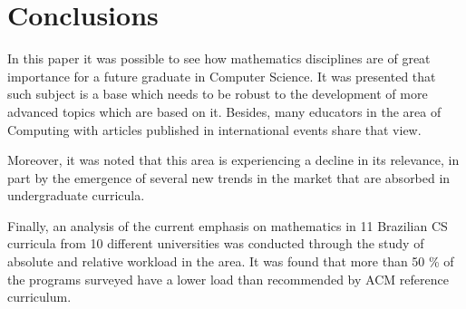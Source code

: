 \documentclass[conference]{IEEEtran}
\begin{document}
\section{Conclusions}
	In this paper it was possible to see how mathematics disciplines are of great importance for a future graduate in Computer Science. It was presented that such subject is a base which needs to be robust to the development of more advanced topics which are based on it. Besides, many educators in the area of Computing with articles published in international events share that view.

	Moreover, it was noted that this area is experiencing a decline in its relevance, in part by the emergence of several new trends in the market that are absorbed in undergraduate curricula.
	
	Finally, an analysis of the current emphasis on mathematics in 11 Brazilian CS curricula from 10 different universities was conducted through the study of absolute and relative workload in the area. It was found that more than 50 \% of the programs surveyed have a lower load than recommended by ACM reference curriculum.
	
%
%

\end{document}
